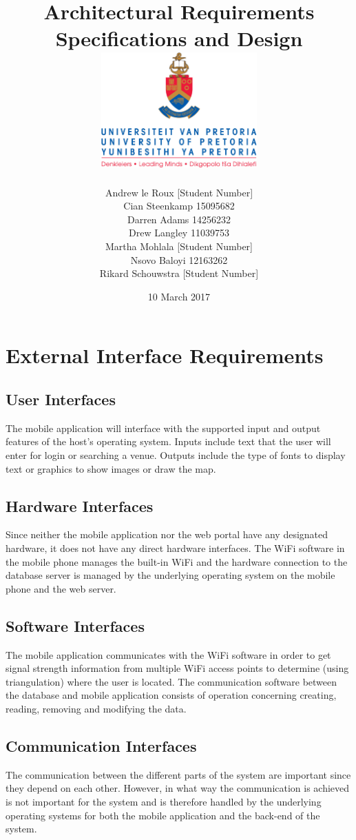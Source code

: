 \documentclass{article}
\title{ Architectural Requirements Specifications and Design \\[0.5cm] \includegraphics[width=6cm]{front-page}}
\author{Andrew le Roux \hfill [Student Number] \\ Cian Steenkamp \hfill 15095682 \\ Darren Adams \hfill 14256232 \\ Drew Langley \hfill 11039753 \\ Martha Mohlala \hfill [Student Number] \\ Nsovo Baloyi \hfill 12163262 \\ Rikard Schouwstra \hfill [Student Number]}
\date{10 March 2017}
\begin{document}
\maketitle
\pagebreak
\tableofcontents
\pagebreak

\section{External Interface Requirements}
    \subsection{User Interfaces}
        The mobile application will interface with the supported input and output
        features of the host's operating system. Inputs include text that the user
        will enter for login or searching a venue. Outputs include the type of fonts
        to display text or graphics to show images or draw the map.

    \subsection{Hardware Interfaces}
        Since neither the mobile application nor the web portal have any designated
        hardware, it does not have any direct hardware interfaces. The WiFi software
        in the mobile phone manages the built-in WiFi and the hardware connection
        to the database server is managed by the underlying operating system on the
        mobile phone and the web server.

    \subsection{Software Interfaces}
        The mobile application communicates with the WiFi software in order to get
        signal strength information from multiple WiFi access points to determine
        (using triangulation) where the user is located. The communication software
        between the database and mobile application consists of operation concerning
        creating, reading, removing and modifying the data.

    \subsection{Communication Interfaces}
        The communication between the different parts of the system are important since they depend on each other. However, in what way the communication is achieved is not important for the system and is therefore handled by the underlying operating systems for both the mobile application and the back-end of the system.
\end{document}
